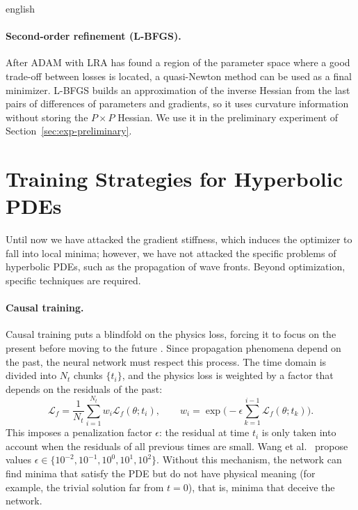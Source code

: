 \documentclass[12pt,letterpaper,twoside]{book}
\newcommand{\Loss}{\mathcal{L}}
\newif\ifreviewmode
\newcommand{\revtag}[2]{\ifreviewmode{\color{red!70!black}\textsf{\footnotesize[#1#2]}}\fi}
\newcommand{\verificar}[1]{\revtag{VERIFICAR}{: #1}}
\begin{document}
\begin{hyphenrules}{english}
\paragraph{Second-order refinement (L-BFGS).}
After ADAM with LRA has found a region of the parameter space where a good trade-off between losses is
located, a quasi-Newton method can be used as a final minimizer. L-BFGS builds an approximation of the
inverse Hessian from the last pairs of differences of parameters and gradients, so it uses curvature
information without storing the $P\times P$ Hessian.\verificar{add reference for L-BFGS (Liu \& Nocedal,
1989)} We use it in the preliminary experiment of Section~\ref{sec:exp-preliminary}.

\section{Training Strategies for Hyperbolic PDEs}\label{sec:training-strategies}

Until now we have attacked the gradient stiffness, which induces the optimizer to fall into local minima;
however, we have not attacked the specific problems of hyperbolic PDEs, such as the propagation of wave
fronts. Beyond optimization, specific techniques are required.

\paragraph{Causal training.}
Causal training puts a blindfold on the physics loss, forcing it to focus on the present before moving
to the future \cite{wang2024causality}. Since propagation phenomena depend on the past, the neural
network must respect this process. The time domain is divided into $N_t$ chunks $\{t_i\}$, and the
physics loss is weighted by a factor that depends on the residuals of the past:
\begin{equation}
  \Loss_f=\frac{1}{N_t}\sum_{i=1}^{N_t}w_i\Loss_f(\theta;t_i),\qquad
  w_i=\exp\Big(-\epsilon\sum_{k=1}^{i-1}\Loss_f(\theta;t_k)\Big).
  \label{eq:causal}
\end{equation}
This imposes a penalization factor $\epsilon$: the residual at time $t_i$ is only taken into account when
the residuals of all previous times are small. Wang et al.~\cite{wang2024causality} propose values
$\epsilon\in\{10^{-2},10^{-1},10^{0},10^{1},10^{2}\}$. Without this mechanism, the network can find
minima that satisfy the PDE but do not have physical meaning (for example, the trivial solution far from
$t=0$), that is, minima that deceive the network.


\end{hyphenrules}
\end{document}
